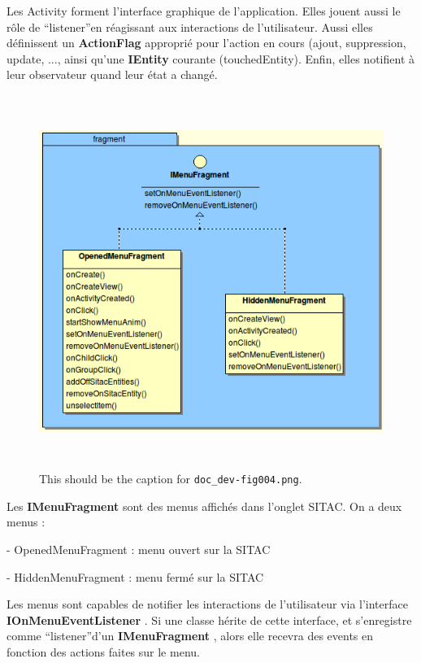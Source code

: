 \documentclass{article}
\begin{document}
\vspace{13pt}
{\color{color01} Les Activity forment l'interface graphique de l'application. Elles 
jouent aussi le rôle de ``listener''en réagissant aux interactions de l'utilisateur. 
Aussi elles définissent un }{\color{color01} \textbf{ActionFlag}}{\color{color01}  
approprié pour l'action en cours (ajout, suppression, update, ..., ainsi qu'une 
}{\color{color01} \textbf{IEntity}}{\color{color01}  courante (touchedEntity). 
Enfin, elles notifient à leur observateur quand leur état a changé.}

\begin{figure}[htbp]
\begin{center}
\includegraphics[width=391pt, height=344pt]{doc_dev-fig004.png}
\caption{This should be the caption for \texttt{doc\_dev-fig004.png}.}
\end{center}
\end{figure}

\vspace{13pt}
{\color{color01} Les }{\color{color01} \textbf{IMenuFragment}}{\color{color01}  
sont des menus affichés dans l'onglet SITAC. On a deux menus :}

\parindent=18pt
{\color{color01} - OpenedMenuFragment : menu ouvert sur la SITAC}

{\color{color01} - HiddenMenuFragment : menu fermé sur la SITAC}

\parindent=0pt
{\color{color01} Les menus sont capables de notifier les interactions de l'utilisateur 
via l'interface }{\color{color01} \textbf{IOnMenuEventListener}}{\color{color01} . 
Si une classe hérite de cette interface, et s'enregistre comme ``listener''d'un 
}{\color{color01} \textbf{IMenuFragment}}{\color{color01} , alors elle recevra 
des events en fonction des actions faites sur le menu.}
\end{document}
